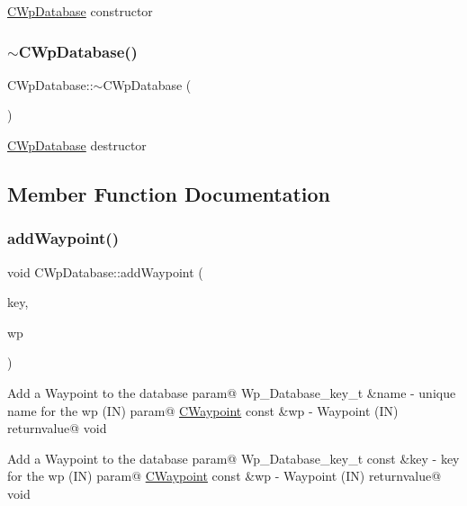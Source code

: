 \hyperlink{classCWpDatabase}{C\+Wp\+Database} constructor \mbox{\label{classCWpDatabase_a9c8209e9d6ba9a4c275cb4f6266950d6}} 
\subsubsection{\texorpdfstring{$\sim$\+C\+Wp\+Database()}{~CWpDatabase()}}
{\footnotesize\ttfamily C\+Wp\+Database\+::$\sim$\+C\+Wp\+Database (\begin{DoxyParamCaption}{ }\end{DoxyParamCaption})}

\hyperlink{classCWpDatabase}{C\+Wp\+Database} destructor 

\subsection{Member Function Documentation}
\mbox{\label{classCWpDatabase_a96d64308fe52f48b423d7c97f9e95dcf}} 
\subsubsection{\texorpdfstring{add\+Waypoint()}{addWaypoint()}}
{\footnotesize\ttfamily void C\+Wp\+Database\+::add\+Waypoint (\begin{DoxyParamCaption}\item[{\hyperlink{CWpDatabase_8h_af4bde7780fd7a000e6647ae788fe5a10}{Wp\+\_\+\+Database\+\_\+key\+\_\+t} const \&}]{key,  }\item[{\hyperlink{classCWaypoint}{C\+Waypoint} const \&}]{wp }\end{DoxyParamCaption})}

Add a Waypoint to the database param@ Wp\+\_\+\+Database\+\_\+key\+\_\+t \&name -\/ unique name for the wp (IN) param@ \hyperlink{classCWaypoint}{C\+Waypoint} const \&wp -\/ Waypoint (IN) returnvalue@ void

Add a Waypoint to the database param@ Wp\+\_\+\+Database\+\_\+key\+\_\+t const \&key -\/ key for the wp (IN) param@ \hyperlink{classCWaypoint}{C\+Waypoint} const \&wp -\/ Waypoint (IN) returnvalue@ void \mbox{\label{classCWpDatabase_a5e7031a38c729dc54ff48834e2a7902f}} 
